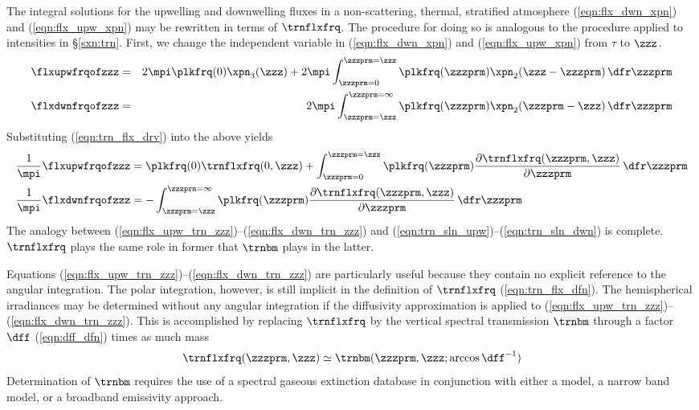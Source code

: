 \documentclass[12pt]{article}
\begin{document}
The integral solutions for the upwelling and downwelling fluxes
in a non-scattering, thermal, stratified atmosphere
(\ref{eqn:flx_dwn_xpn}) and (\ref{eqn:flx_upw_xpn}) may be rewritten in
terms of $\trnflxfrq$.  
The procedure for doing so is analogous to the procedure applied to
intensities in \S\ref{sxn:trn}. 
First, we change the independent variable in (\ref{eqn:flx_dwn_xpn})
and (\ref{eqn:flx_upw_xpn}) from $\tau$ to $\zzz$.
\begin{eqnarray}
\label{eqn:flx_upw_xpn_zzz}
\flxupwfrqofzzz & = & 2 \mpi \plkfrq(0) \xpn_{3}(\zzz) +  
2 \mpi \int_{\zzzprm = 0}^{\zzzprm = \zzz}
\plkfrq(\zzzprm) \xpn_{2}(\zzz-\zzzprm) \,\dfr\zzzprm \nonumber \\
\label{eqn:flx_dwn_xpn_zzz}
\flxdwnfrqofzzz & = & 2 \mpi \int_{\zzzprm = \zzz}^{\zzzprm = \infty} 
\plkfrq(\zzzprm) \xpn_{2}(\zzzprm - \zzz) \,\dfr\zzzprm \nonumber
\end{eqnarray}
Substituting (\ref{eqn:trn_flx_drv}) into the above yields
\begin{subequations}
\label{eqn:flx_trn_zzz}
\begin{align}
\label{eqn:flx_upw_trn_zzz}
\frac{1}{\mpi} \flxupwfrqofzzz & = 
\plkfrq(0) \trnflxfrq(0,\zzz) +  
\int_{\zzzprm = 0}^{\zzzprm = \zzz}
\plkfrq(\zzzprm) 
\frac{\partial \trnflxfrq(\zzzprm,\zzz)}{\partial \zzzprm} 
\,\dfr\zzzprm \\
\label{eqn:flx_dwn_trn_zzz}
\frac{1}{\mpi} \flxdwnfrqofzzz & = 
- \int_{\zzzprm = \zzz}^{\zzzprm = \infty} 
\plkfrq(\zzzprm) 
\frac{\partial \trnflxfrq(\zzzprm,\zzz)}{\partial \zzzprm} 
\,\dfr\zzzprm
\end{align}
\end{subequations} 
The analogy between
(\ref{eqn:flx_upw_trn_zzz})--(\ref{eqn:flx_dwn_trn_zzz}) and 
(\ref{eqn:trn_sln_upw})--(\ref{eqn:trn_sln_dwn}) is complete. 
$\trnflxfrq$ plays the same role in former that $\trnbm$ plays in the
latter. 

Equations (\ref{eqn:flx_upw_trn_zzz})--(\ref{eqn:flx_dwn_trn_zzz})
are particularly useful because they contain no explicit reference to
the angular integration.
The polar integration, however, is still implicit in the definition of 
$\trnflxfrq$ (\ref{eqn:trn_flx_dfn}).
The hemispherical irradiances may be determined without any angular
integration if the diffusivity approximation is applied to 
(\ref{eqn:flx_upw_trn_zzz})--(\ref{eqn:flx_dwn_trn_zzz}).
This is accomplished by replacing $\trnflxfrq$ by the vertical
spectral transmission $\trnbm$ through a factor $\dff$
(\ref{eqn:dff_dfn}) times as much mass  
\begin{equation}
\trnflxfrq(\zzzprm,\zzz) \simeq \trnbm(\zzzprm,\zzz;\arccos \dff^{-1}) 
\label{eqn:dff_prx}
\end{equation}
Determination of $\trnbm$ requires the use of a spectral gaseous
extinction database in conjunction with either a 
model, a narrow band model, or a broadband emissivity approach.
\end{document}
